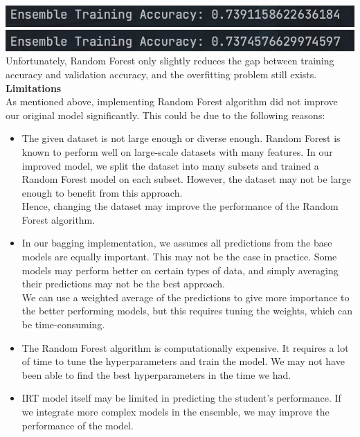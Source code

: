\documentclass{article}
\begin{document}
\begin{enumerate}
    \includegraphics[width=0.7\linewidth]{6111723195885_.pic.jpg} \vspace{10}\\
    \includegraphics[width=0.7\linewidth]{6131723196143_.pic.jpg} \vspace{15}\\
    Unfortunately, Random Forest only slightly reduces the gap between training accuracy and validation accuracy, and the overfitting problem still exists.\vspace{20}\\

    \textbf{Limitations} \vspace{15}\\
    As mentioned above, implementing Random Forest algorithm did not improve our original model significantly. This could be due to the following reasons: \vspace{10} \\
\begin{itemize}
    \item The given dataset is not large enough or diverse enough. Random Forest is known to perform well on large-scale datasets with many features. In our improved model, we split the dataset into many subsets and trained a Random Forest model on each subset. However, the dataset may not be large enough to benefit from this approach.\\
    Hence, changing the dataset may improve the performance of the Random Forest algorithm. \vspace{10}\\
    
    \item In our bagging implementation, we assumes all predictions from the base models are equally important. This may not be the case in practice. Some models may perform better on certain types of data, and simply averaging their predictions may not be the best approach.\\
    We can use a weighted average of the predictions to give more importance to the better performing models, but this requires tuning the weights, which can be time-consuming.
    \vspace{10}\\
    \item The Random Forest algorithm is computationally expensive. It requires a lot of time to tune the hyperparameters and train the model. We may not have been able to find the best hyperparameters in the time we had.
    \vspace{10}\\
    \item IRT model itself may be limited in predicting the student's performance. If we integrate more complex models in the ensemble, we may improve the performance of the model.
\end{itemize}


\end{enumerate}
\end{document}

